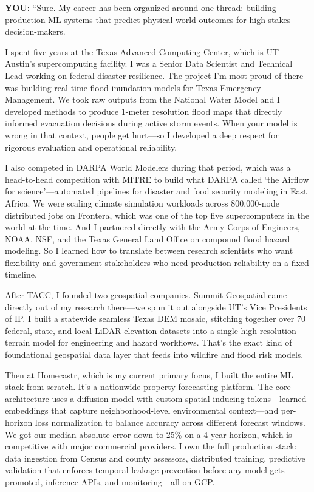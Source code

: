 \documentclass[11pt,letterpaper]{article}
\newenvironment{you}{\begin{mdframed}[backgroundcolor=youbg,linewidth=0pt,innertopmargin=8pt,innerbottommargin=8pt]\textbf{\color{xblue}YOU:} }{\end{mdframed}}
\begin{document}
\begin{you}
``Sure. My career has been organized around one thread: building production ML systems that predict physical-world outcomes for high-stakes decision-makers.

I spent five years at the Texas Advanced Computing Center, which is UT Austin's supercomputing facility. I was a Senior Data Scientist and Technical Lead working on federal disaster resilience. The project I'm most proud of there was building real-time flood inundation models for Texas Emergency Management. We took raw outputs from the National Water Model and I developed methods to produce 1-meter resolution flood maps that directly informed evacuation decisions during active storm events. When your model is wrong in that context, people get hurt---so I developed a deep respect for rigorous evaluation and operational reliability.

I also competed in DARPA World Modelers during that period, which was a head-to-head competition with MITRE to build what DARPA called `the Airflow for science'---automated pipelines for disaster and food security modeling in East Africa. We were scaling climate simulation workloads across 800,000-node distributed jobs on Frontera, which was one of the top five supercomputers in the world at the time. And I partnered directly with the Army Corps of Engineers, NOAA, NSF, and the Texas General Land Office on compound flood hazard modeling. So I learned how to translate between research scientists who want flexibility and government stakeholders who need production reliability on a fixed timeline.

After TACC, I founded two geospatial companies. Summit Geospatial came directly out of my research there---we spun it out alongside UT's Vice Presidents of IP. I built a statewide seamless Texas DEM mosaic, stitching together over 70 federal, state, and local LiDAR elevation datasets into a single high-resolution terrain model for engineering and hazard workflows. That's the exact kind of foundational geospatial data layer that feeds into wildfire and flood risk models.

Then at Homecastr, which is my current primary focus, I built the entire ML stack from scratch. It's a nationwide property forecasting platform. The core architecture uses a diffusion model with custom spatial inducing tokens---learned embeddings that capture neighborhood-level environmental context---and per-horizon loss normalization to balance accuracy across different forecast windows. We got our median absolute error down to 25\% on a 4-year horizon, which is competitive with major commercial providers. I own the full production stack: data ingestion from Census and county assessors, distributed training, predictive validation that enforces temporal leakage prevention before any model gets promoted, inference APIs, and monitoring---all on GCP.


\end{you}
\end{document}
